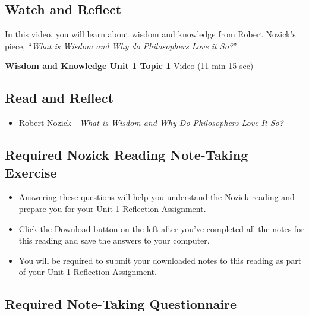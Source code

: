 \documentclass[
]{book}
\providecommand{\tightlist}{%
  \setlength{\itemsep}{0pt}\setlength{\parskip}{0pt}}
\begin{document}
\hypertarget{watch-and-reflect}{%
\subsection*{Watch and Reflect}\label{watch-and-reflect}}

In this video, you will learn about wisdom and knowledge from Robert Nozick's piece, ``\emph{What is Wisdom and Why do Philosophers Love it So?}''

\textbf{Wisdom and Knowledge Unit 1 Topic 1} Video (11 min 15 sec)

\hypertarget{read-and-reflect}{%
\subsection*{Read and Reflect}\label{read-and-reflect}}

\begin{itemize}
\tightlist
\item
  Robert Nozick - \href{assets/u1/PHIL-100-Nozick-What-is-Wisdom.pdf}{\emph{What is Wisdom and Why Do Philosophers Love It So?}}
\end{itemize}

\hypertarget{required-nozick-reading-note-taking-exercise}{%
\subsection*{Required Nozick Reading Note-Taking Exercise}\label{required-nozick-reading-note-taking-exercise}}

\begin{reflect}
\begin{itemize}
\tightlist
\item
  Answering these questions will help you understand the Nozick reading and prepare you for your Unit 1 Reflection Assignment.
\item
  Click the Download button on the left after you've completed all the notes for this reading and save the answers to your computer.
\item
  You will be required to submit your downloaded notes to this reading as part of your Unit 1 Reflection Assignment.
\end{itemize}
\end{reflect}

\hypertarget{required-note-taking-questionnaire}{%
\subsection*{Required Note-Taking Questionnaire}\label{required-note-taking-questionnaire}}
\end{document}
